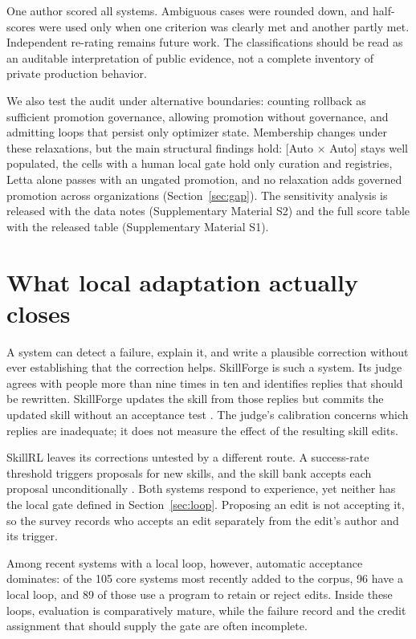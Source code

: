One author scored all systems. Ambiguous cases were rounded down, and half-scores were used only when one criterion was clearly met and another partly met. Independent re-rating remains future work. The classifications should be read as an auditable interpretation of public evidence, not a complete inventory of private production behavior.

We also test the audit under alternative boundaries: counting rollback as sufficient promotion governance, allowing promotion without governance, and admitting loops that persist only optimizer state. Membership changes under these relaxations, but the main structural findings hold: {[}Auto × Auto{]} stays well populated, the cells with a human local gate hold only curation and registries, Letta alone passes with an ungated promotion, and no relaxation adds governed promotion across organizations (Section~\ref{sec:gap}). The sensitivity analysis is released with the data notes (Supplementary Material S2) and the full score table with the released table (Supplementary Material S1).

\section{What local adaptation actually closes}\label{sec:findings}

A system can detect a failure, explain it, and write a plausible correction without ever establishing that the correction helps. SkillForge is such a system. Its judge agrees with people more than nine times in ten and identifies replies that should be rewritten. SkillForge updates the skill from those replies but commits the updated skill without an acceptance test \cite{skillforge2026}. The judge's calibration concerns which replies are inadequate; it does not measure the effect of the resulting skill edits.

SkillRL leaves its corrections untested by a different route. A success-rate threshold triggers proposals for new skills, and the skill bank accepts each proposal unconditionally \cite{skillrl2026}. Both systems respond to experience, yet neither has the local gate defined in Section~\ref{sec:loop}. Proposing an edit is not accepting it, so the survey records who accepts an edit separately from the edit's author and its trigger.

Among recent systems with a local loop, however, automatic acceptance dominates: of the 105 core systems most recently added to the corpus, 96 have a local loop, and 89 of those use a program to retain or reject edits. Inside these loops, evaluation is comparatively mature, while the failure record and the credit assignment that should supply the gate are often incomplete.

